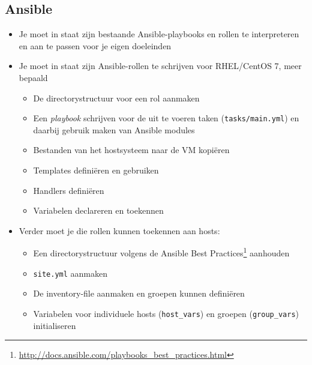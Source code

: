 \subsection{Ansible}
\label{ansible}

\begin{itemize}
\item Je moet in staat zijn bestaande Ansible-playbooks en rollen te interpreteren en aan te passen voor je eigen doeleinden
\item Je moet in staat zijn Ansible-rollen te schrijven voor RHEL/CentOS 7, meer bepaald

  \begin{itemize}
  \item De directorystructuur voor een rol aanmaken
  \item Een \emph{playbook} schrijven voor de uit te voeren taken (\texttt{tasks/main.yml}) en daarbij gebruik maken van Ansible modules
  \item Bestanden van het hostsysteem naar de VM kopiëren
  \item Templates definiëren en gebruiken
  \item Handlers definiëren
  \item Variabelen declareren en toekennen
  \end{itemize}

\item Verder moet je die rollen kunnen toekennen aan hosts:

  \begin{itemize}
    \item Een directorystructuur volgens de Ansible Best Practices\footnote{\url{http://docs.ansible.com/playbooks_best_practices.html}} aanhouden
  \item \texttt{site.yml} aanmaken
  \item De inventory-file aanmaken en groepen kunnen definiëren
  \item Variabelen voor individuele hosts (\texttt{host\_vars}) en groepen (\texttt{group\_vars}) initialiseren
  \end{itemize}
\end{itemize}
